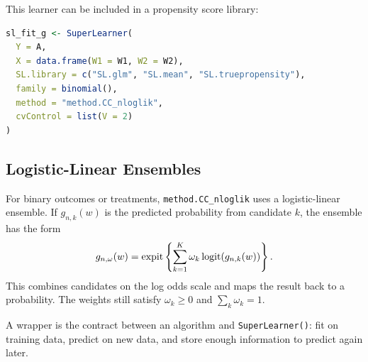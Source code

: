 This learner can be included in a propensity score library:

\begin{implementationbox}
\begin{lstlisting}[language=R]
sl_fit_g <- SuperLearner(
  Y = A,
  X = data.frame(W1 = W1, W2 = W2),
  SL.library = c("SL.glm", "SL.mean", "SL.truepropensity"),
  family = binomial(),
  method = "method.CC_nloglik",
  cvControl = list(V = 2)
)
\end{lstlisting}
\end{implementationbox}

\subsection{Logistic-Linear Ensembles}

For binary outcomes or treatments, \texttt{method.CC\_nloglik} uses a
logistic-linear ensemble. If $g_{n,k}(w)$ is the predicted probability from candidate
$k$, the ensemble has the form
\[
g_{n,\omega}(w)
=
\operatorname{expit}\left\{\sum_{k=1}^K\omega_k\operatorname{logit}(g_{n,k}(w))\right\}.
\]
This combines candidates on the log odds scale and maps the result back to a
probability. The weights still satisfy $\omega_k\ge 0$ and $\sum_k\omega_k=1$.

\begin{keyidea}
A wrapper is the contract between an algorithm and \texttt{SuperLearner()}: fit on
training data, predict on new data, and store enough information to predict again
later.
\end{keyidea}
